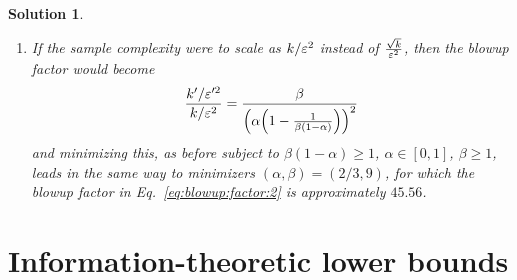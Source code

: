 \documentclass[biber]{nowfnt} %
\newtheorem{solution}{Solution}[chapter]
\begin{document}
\begin{solution}
\begin{enumerate}
\begin{equation}
  	\label{eq:blowup:factor}
  	\frac{\sqrt{\beta}}{\Paren{\alpha\Paren{1-\frac{1}{\beta(1-\alpha)}}}^2}
  \end{equation}
  subject to $\beta(1-\alpha)\geq 1$, $\alpha\in[0,1]$, $\beta \geq 1$. For the sake of the minimization, it is easier to minimize the square of this quantity, and to set $ \gamma \eqdef \beta(1-\alpha)$, so that we seek to find the minimizer of
  \[
  		\frac{\beta}{\alpha^4\Paren{1-\frac{1}{\beta(1-\alpha)}}^4} = \frac{1}{\alpha^4(1-\alpha)} \cdot \frac{\gamma^5}{(\gamma-1)^4}
  \]
  subject to $\alpha\in[0,1]$ and $\gamma \geq 1$. The variables are now separated, and we can minimize separately in $\alpha$ and in $\gamma$. This leads to minimizers $\alpha^\ast=4/5$ and $\gamma^\ast=5$. Getting back to our original quantity, we therefore get that it is minimized for $(\alpha,\beta)=(4/5, 25)$, for which the blowup factor in Eq.~\eqref{eq:blowup:factor} is approximately $\boxed{12.21}$.
  \item If the sample complexity were to scale as $k/\varepsilon^2$ instead of $\frac{\sqrt{k}}{\varepsilon^2}$, then the blowup factor would become 
  \begin{equation}
  	\label{eq:blowup:factor:2}
  	\frac{\ab'/\dst'^2}{\ab/\dst^2} = \frac{\beta}{\Paren{\alpha\Paren{1-\frac{1}{\beta(1-\alpha)}}}^2}
  \end{equation}
  and minimizing this, as before subject to $\beta(1-\alpha)\geq 1$, $\alpha\in[0,1]$, $\beta \geq 1$, leads in the same way to minimizers $(\alpha,\beta)=(2/3, 9)$, for which the blowup factor in Eq.~\eqref{eq:blowup:factor:2} is approximately $\boxed{45.56}$.
\end{enumerate}
\end{solution}

\chapter{Information-theoretic lower bounds}
  \label{chap:lowerbounds}
  
\end{document}
